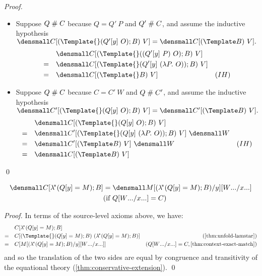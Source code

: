 \begin{proof}
\begin{itemize}
  \item Suppose $Q \mathrel{\#} C$ because $Q = Q' ~ P$ and $Q' \mathrel{\#} C$, and assume the inductive hypothesis
    \begin{math}
      \den{C[(\Template{} (Q'[y] ~ O); B) ~ V]} = \den{C[(\Template B) ~ V]}
      .
    \end{math}
    \begin{align*}
      & \quad \den{C[(\Template{} ((Q'[y] ~P) ~ O); B) ~ V]} \\
      =& \quad \den{C[(\Template{} (Q'[y] ~ (\lambda P. ~O)); B) ~ V]} \\
      =& \quad \den{C[(\Template{} B) ~ V]} & (IH)
    \end{align*}
  \item Suppose $Q \mathrel{\#} C$ because $C = C' ~ W$ and  $Q \mathrel{\#} C'$, and assume the inductive hypothesis
    \begin{math}
      \den{C'[(\Template{} (Q[y] ~ O); B) ~ V]} = \den{C'[(\Template B) ~ V]}
      .
    \end{math}
    \begin{align*}
      & \quad \den{C[(\Template{} (Q[y] ~ O); B) ~ V]} \\
      =& \quad \den{C'[(\Template{} (Q[y] ~ (\lambda P. ~O)); B) ~ V]} ~\den{W}\\
      =& \quad \den{C'[(\Template B) ~ V]} ~\den{W} & (IH)\\
      =& \quad \den{C[(\Template B) ~ V]}
    \end{align*}
  \end{itemize}
  \qed
\end{proof}

\begin{lemma}
  \label{thm:context-lamstar-match}
  \begin{align*}
    \den{C[\lamstar (Q[y] = M); B]}
    &=
    \den{M\subst{y}{(\lamstar (Q[y] = M); B)}\subst{\many{x}}{\many{W}}}
    \\
    &(\text{if } Q\subst{\many{x}}{\many{W}} = C)
  \end{align*}
\end{lemma}
\begin{proof}
  In terms of the source-level axioms above, we have:
  \begin{align*}
    &\quad
    C[\lamstar (Q[y] = M); B]
    \\
    =&\quad
    C[(\Template{} (Q[y] = M); B)~(\lamstar (Q[y]=M); B)]
    &(\cref{thm:unfold-lamstar})
    \\
    =&\quad
    C[M\subst{y}{(\lamstar (Q[y]=M); B)}\subst{\many{x}}{\many{W}}]
    &(Q\subst{\many{x}}{\many{W}} = C, \cref{thm:context-exact-match})
  \end{align*}
  and so the translation of the two sides are equal by congruence and transitivity of the equational theory (\cref{thm:conservative-extension}).
  \qed
\end{proof}

